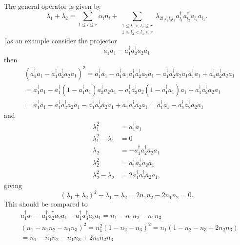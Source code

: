 \documentclass[aps,preprint]{revtex4}%
\begin{document}
The general operator is given by%
\begin{equation}
\lambda_{1}+\lambda_{2}=\sum_{1\leq l\leq r}\alpha_{l}n_{l}+\sum
_{\substack{1\leq l_{1}<l_{2}\leq r\\1\leq l_{3}<l_{4}\leq r}}\lambda
_{2l_{1}l_{2}l_{3}l_{4}}a_{l_{1}}^{\dagger}a_{l_{2}}^{\dagger}a_{l_{4}%
}a_{l_{3}}.
\end{equation}
$\lceil$as an example consider the projector%
\begin{equation}
a_{1}^{\dagger}a_{1}-a_{1}^{\dagger}a_{2}^{\dagger}a_{2}a_{1}%
\end{equation}
then%
\begin{align}
&  \left(  a_{1}^{\dagger}a_{1}-a_{1}^{\dagger}a_{2}^{\dagger}a_{2}%
a_{1}\right)  ^{2}=a_{1}^{\dagger}a_{1}-a_{1}^{\dagger}a_{1}a_{1}^{\dagger
}a_{2}^{\dagger}a_{2}a_{1}-a_{1}^{\dagger}a_{2}^{\dagger}a_{2}a_{1}%
a_{1}^{\dagger}a_{1}+a_{1}^{\dagger}a_{2}^{\dagger}a_{2}a_{1}\nonumber\\
&  =a_{1}^{\dagger}a_{1}-a_{1}^{\dagger}\left(  1-a_{1}^{\dagger}a_{1}\right)
a_{2}^{\dagger}a_{2}a_{1}-a_{1}^{\dagger}a_{2}^{\dagger}a_{2}\left(
1-a_{1}^{\dagger}a_{1}\right)  a_{1}+a_{1}^{\dagger}a_{2}^{\dagger}a_{2}%
a_{1}\nonumber\\
&  =a_{1}^{\dagger}a_{1}-a_{1}^{\dagger}a_{2}^{\dagger}a_{2}a_{1}%
-a_{1}^{\dagger}a_{2}^{\dagger}a_{2}a_{1}+a_{1}^{\dagger}a_{2}^{\dagger}%
a_{2}a_{1}=a_{1}^{\dagger}a_{1}-a_{1}^{\dagger}a_{2}^{\dagger}a_{2}a_{1}%
\end{align}
and
\begin{align}
\lambda_{1}^{2}  &  =a_{1}^{\dagger}a_{1}\nonumber\\
\lambda_{1}^{2}-\lambda_{1}  &  =0\nonumber\\
\lambda_{2}  &  =-a_{1}^{\dagger}a_{2}^{\dagger}a_{2}a_{1}\nonumber\\
\lambda_{2}^{2}  &  =a_{1}^{\dagger}a_{2}^{\dagger}a_{2}a_{1}\nonumber\\
\lambda_{2}^{2}-\lambda_{2}  &  =2a_{1}^{\dagger}a_{2}^{\dagger}a_{2}a_{1},
\end{align}
giving
\begin{equation}
\left(  \lambda_{1}+\lambda_{2}\right)  ^{2}-\lambda_{1}-\lambda_{2}%
=2n_{1}n_{2}-2n_{1}n_{2}=0.
\end{equation}
This should be compared to
\begin{align}
&  a_{1}^{\dagger}a_{1}-a_{1}^{\dagger}a_{2}^{\dagger}a_{2}a_{1}%
-a_{1}^{\dagger}a_{3}^{\dagger}a_{3}a_{1}=n_{1}-n_{1}n_{2}-n_{1}n_{3}\\
&  \left(  n_{1}-n_{1}n_{2}-n_{1}n_{3}\right)  ^{2}=n_{1}^{2}\left(
1-n_{2}-n_{3}\right)  ^{2}=n_{1}\left(  1-n_{2}-n_{3}+2n_{2}n_{3}\right)
\nonumber\\
&  =n_{1}-n_{1}n_{2}-n_{1}n_{3}+2n_{1}n_{2}n_{3}%
\end{align}
\end{document}
